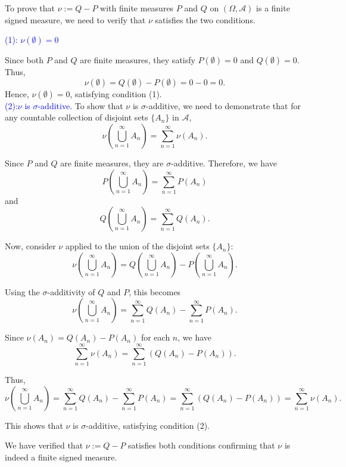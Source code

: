 \documentclass{report}
\begin{document}
\begin{myproof}
To prove that \(\nu := Q - P\) with finite measures \(P\) and \(Q\) on \((\Omega, \mathcal{A})\) is a finite signed measure, we need to verify that \(\nu\) satisfies the two conditions.

\textcolor{blue}{(1): \(\nu(\emptyset) = 0\)}

Since both \(P\) and \(Q\) are finite measures, they satisfy \(P(\emptyset) = 0\) and \(Q(\emptyset) = 0\). Thus,
\[ \nu(\emptyset) = Q(\emptyset) - P(\emptyset) = 0 - 0 = 0. \]
Hence, \(\nu(\emptyset) = 0\), satisfying condition (1).\\
\textcolor{blue}{(2):\(\nu\) is \(\sigma\)-additive.}
To show that \(\nu\) is \(\sigma\)-additive, we need to demonstrate that for any countable collection of disjoint sets \(\{A_n\}\) in \(\mathcal{A}\),
\[ \nu\left(\bigcup_{n=1}^\infty A_n\right) = \sum_{n=1}^\infty \nu(A_n). \]

Since \(P\) and \(Q\) are finite measures, they are \(\sigma\)-additive. Therefore, we have
\[ P\left(\bigcup_{n=1}^\infty A_n\right) = \sum_{n=1}^\infty P(A_n) \]
and
\[ Q\left(\bigcup_{n=1}^\infty A_n\right) = \sum_{n=1}^\infty Q(A_n). \]

Now, consider \(\nu\) applied to the union of the disjoint sets \(\{A_n\}\):
\[
\nu\left(\bigcup_{n=1}^\infty A_n\right) = Q\left(\bigcup_{n=1}^\infty A_n\right) - P\left(\bigcup_{n=1}^\infty A_n\right).
\]

Using the \(\sigma\)-additivity of \(Q\) and \(P\), this becomes
\[
\nu\left(\bigcup_{n=1}^\infty A_n\right) = \sum_{n=1}^\infty Q(A_n) - \sum_{n=1}^\infty P(A_n).
\]

Since \(\nu(A_n) = Q(A_n) - P(A_n)\) for each \(n\), we have
\[
\sum_{n=1}^\infty \nu(A_n) = \sum_{n=1}^\infty (Q(A_n) - P(A_n)).
\]

Thus,
\[
\nu\left(\bigcup_{n=1}^\infty A_n\right) = \sum_{n=1}^\infty Q(A_n) - \sum_{n=1}^\infty P(A_n) = \sum_{n=1}^\infty (Q(A_n) - P(A_n)) = \sum_{n=1}^\infty \nu(A_n).
\]

This shows that \(\nu\) is \(\sigma\)-additive, satisfying condition (2).

We have verified that \(\nu := Q - P\) satisfies both conditions confirming that \(\nu\) is indeed a finite signed measure.
\end{myproof}
\end{document}
